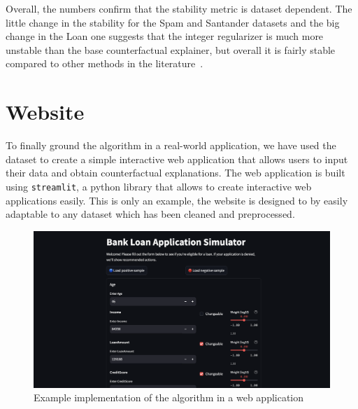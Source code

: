 \documentclass[12pt]{extarticle}
\numberwithin{equation}{section}
\begin{document}
Overall, the numbers confirm that the stability metric is dataset dependent. The little change in the stability for the Spam and Santander datasets and the big change in the Loan one suggests that the integer regularizer is much more unstable than the base counterfactual explainer, but overall it is fairly stable compared to other methods in the literature~\cite{bodria2023benchmarking}.


\section{Website}\label{sec:website}
To finally ground the algorithm in a real-world application, we have used the ~\cite{kaggleLoan1} dataset to create a simple interactive web application that allows users to input their data and obtain counterfactual explanations. The web application is built using \texttt{streamlit}, a python library that allows to create interactive web applications easily. This is only an example, the website is designed to by easily adaptable to any dataset which has been cleaned and preprocessed. 

\begin{figure}[H]
    \centering
    \includegraphics[width=1\textwidth]{images/website}
    \caption{Example implementation of the algorithm in a web application}
    \label{fig:website}
\end{figure}
\end{document}
